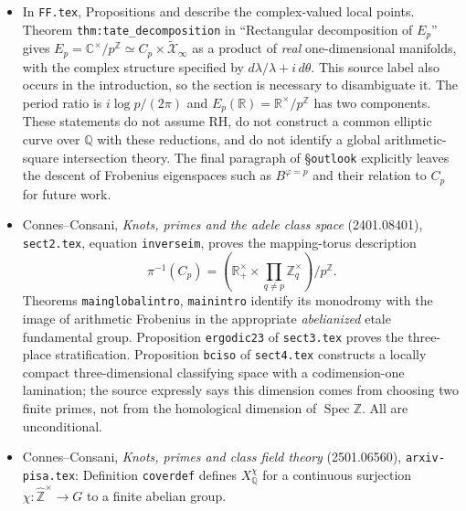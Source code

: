\begin{itemize}
points of the Fargues--Fontaine curve.  Theorem
\texttt{scholze\_heuristic} and the unlabelled theorem in ``The universal
tilting functor and the geometric sieve'' give the corresponding
matched-prime and mismatched-prime descriptions.  Algebraic closedness,
the topology, and the distinction between trivial and nontrivial points
are part of these statements, not consequences of A.
\item In \texttt{FF.tex}, Propositions
 and
 describe the complex-valued local
points.  Theorem \texttt{thm:tate\_decomposition} in ``Rectangular
decomposition of $E_p$'' gives
$E_p=\mathbb C^\times/p^{\mathbb Z}
\simeq C_p\times\widetilde{\mathcal X}_\infty$ as a product of
\emph{real} one-dimensional manifolds, with the complex structure
specified by $d\lambda/\lambda+i\,d\theta$.  This source label also
occurs in the introduction, so the section is necessary to disambiguate
it.  The period ratio is $i\log p/(2\pi)$ and
$E_p(\mathbb R)=\mathbb R^\times/p^{\mathbb Z}$ has two components.
These statements do not assume RH, do not construct a common elliptic
curve over $\mathbb Q$ with these reductions, and do not identify a
global arithmetic-square intersection theory.  The final paragraph of
\S\texttt{outlook} explicitly leaves the descent of Frobenius
eigenspaces such as $B^{\varphi=p}$ and their relation to $C_p$ for
future work.
\item Connes--Consani, \emph{Knots, primes and the adele class space}
(2401.08401), \texttt{sect2.tex}, equation \texttt{inverseim}, proves
the mapping-torus description
\[
 \pi^{-1}(C_p)=
 \left(\mathbb R_+^\times\times
        \prod_{q\ne p}\mathbb Z_q^\times\right)/p^{\mathbb Z}.
\]
Theorems \texttt{mainglobalintro}, \texttt{mainintro} identify its
monodromy with the image of arithmetic Frobenius in the appropriate
\emph{abelianized} etale fundamental group.  Proposition
\texttt{ergodic23} of \texttt{sect3.tex} proves the three-place
stratification.  Proposition \texttt{bciso} of \texttt{sect4.tex}
constructs a locally compact three-dimensional classifying space with
a codimension-one lamination; the source expressly says this dimension
comes from choosing two finite primes, not from the homological
dimension of $\operatorname{Spec}\mathbb Z$.  All are unconditional.
\item Connes--Consani, \emph{Knots, primes and class field theory}
(2501.06560), \texttt{arxiv-pisa.tex}: Definition \texttt{coverdef}
defines $X_{\mathbb Q}^{\chi}$ for a continuous surjection
$\chi:\widehat{\mathbb Z}^\times\to G$ to a finite abelian group.

\end{itemize}
